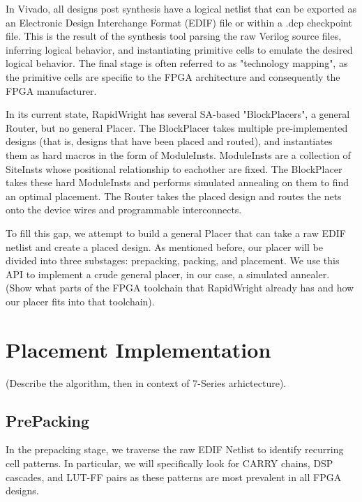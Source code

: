 \documentclass[twocolumn]{article}
\begin{document}
    In Vivado, all designs post synthesis have a logical netlist that can be exported as an Electronic Design Interchange Format (EDIF) file or within a .dcp checkpoint file. 
    This is the result of the synthesis tool parsing the raw Verilog source files, inferring logical behavior, and instantiating primitive cells to emulate the desired logical behavior. 
    The final stage is often referred to as "technology mapping", as the primitive cells are specific to the FPGA architecture and consequently the FPGA manufacturer. 

    In its current state, RapidWright has several SA-based "BlockPlacers", a general Router, but no general Placer. 
    The BlockPlacer takes multiple pre-implemented designs (that is, designs that have been placed and routed), and instantiates them as hard macros in the form of ModuleInsts. 
    ModuleInsts are a collection of SiteInsts whose positional relationship to eachother are fixed. 
    The BlockPlacer takes these hard ModuleInsts and performs simulated annealing on them to find an optimal placement. 
    The Router takes the placed design and routes the nets onto the device wires and programmable interconnects.

    To fill this gap, we attempt to build a general Placer that can take a raw EDIF netlist and create a placed design. 
    As mentioned before, our placer will be divided into three substages: prepacking, packing, and placement.
    We use this API to implement a crude general placer, in our case, a simulated annealer. 
    (Show what parts of the FPGA toolchain that RapidWright already has and how our placer fits into that toolchain). 


\section{Placement Implementation}
    (Describe the algorithm, then in context of 7-Series arhictecture). \\

    \subsection{PrePacking}
        In the prepacking stage, we traverse the raw EDIF Netlist to identify recurring cell patterns. 
        In particular, we will specifically look for CARRY chains, DSP cascades, and LUT-FF pairs as these patterns are most prevalent in all FPGA designs.
\end{document}
